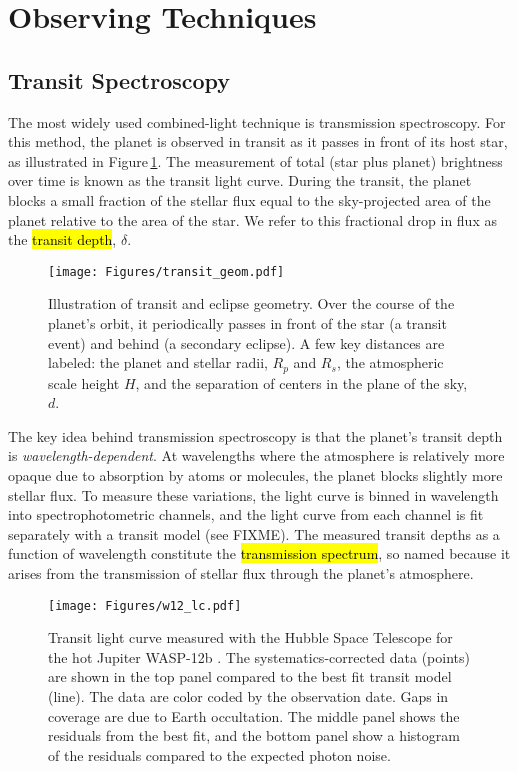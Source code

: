 \documentclass[graybox,natbib,nosecnum]{svmult}
\newcommand{\hbindex}[1]{\hl{#1}\index{#1}}  %
\begin{document}
\section{Observing Techniques} 

\subsection{Transit Spectroscopy}
The most widely used combined-light technique is transmission spectroscopy. For this method, the planet is observed in transit as it passes in front of its host star, as illustrated in Figure\,\ref{fig:geom}.  The measurement of total (star plus planet) brightness over time is known as the transit light curve.  During the transit, the planet blocks a small fraction of the stellar flux equal to the sky-projected area of the planet relative to the area of the star. We refer to this fractional drop in flux as the \hbindex{transit depth}, $\delta$. 


\begin{figure}
\begin{centering}
\texttt{[image: Figures/transit\_geom.pdf]}
\caption{Illustration of transit and eclipse geometry. Over the course of the planet's orbit, it periodically passes in front of the star (a transit event) and behind (a secondary eclipse). A few key distances are labeled: the planet and stellar radii, $R_p$ and $R_s$, the atmospheric scale height $H$, and the separation of centers in the plane of the sky, $d$.}
\label{fig:geom}       
\end{centering}
\end{figure}

The key idea behind transmission spectroscopy is that the planet's transit depth is \emph{wavelength-dependent}.  At wavelengths where the atmosphere is relatively more opaque due to absorption by atoms or molecules, the planet blocks slightly more stellar flux.  To measure these variations, the light curve is binned in wavelength into spectrophotometric channels, and the light curve from each channel is fit separately with a transit model (see FIXME).  The measured transit depths as a function of wavelength constitute the \hbindex{transmission spectrum}, so named because it arises from the transmission of stellar flux through the planet's atmosphere.
 
\begin{figure}
\begin{centering}
\texttt{[image: Figures/w12\_lc.pdf]}
\caption{Transit light curve measured with the Hubble Space Telescope for the hot Jupiter WASP-12b \citep{kreidberg14b}. The systematics-corrected data (points) are shown in the top panel compared to the best fit transit model (line). The data are color coded by the observation date. Gaps in coverage are due to Earth occultation. The middle panel shows the residuals from the best fit, and the bottom panel show a histogram of the residuals compared to the expected photon noise.}
\label{fig:lc}       
\end{centering}
\end{figure}
\end{document}
